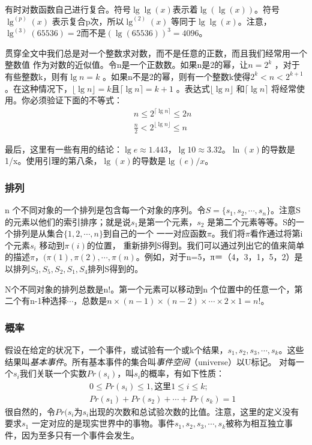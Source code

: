 有时对数函数自己进行复合。符号$\lg\lg(x)$表示着$\lg(\lg(x))$。符号$\lg^{(p)}(x)$
表示复合p次，所以$\lg^{(2)}(x)$
等同于$\lg\lg(x)$。注意，$\lg^{(3)}(65536)=2$而不是$(\lg(65536))^3=4096$。

贯穿全文中我们总是对一个整数求对数，而不是任意的正数，而且我们经常用一个整数值
作为对数的近似值。令n是一个正数数。如果n是2的幂，让$n=2^k$
，对于有些整数k，则有$\lg n=k$
。如果n不是2的幂，则有一个整数k使得$2^k<n<2^{k+1}$
。在这种情况下，$\lfloor \lg n \rfloor =k$且$\lceil \lg n \rceil
=k+1$ 。表达式$\lfloor \lg n \rfloor$ 和$\lceil \lg n \rceil$
将经常使用。你必须验证下面的不等式：
\begin{eqnarray*}
    && n \leq 2^{\lceil \lg n\rceil} \leq 2n \\
    && \frac{n}{2} < 2^{\lfloor \lg n\rfloor} \leq n
\end{eqnarray*}

最后，这里有一些有用的结论：$\lg e\approx 1.443$，$\lg 10 \approx
3.32$。$\ln(x)$的导数是1/x。使用引理的第八条，$\lg(x)$的导数是$\lg(e)/x$。

\subsubsection{排列}
n 个不同对象的一个排列是包含每一个对象的序列。令$S=\{s_1, s_2,
\cdots,
s_n\}$。注意S的元素以他们的索引排序；就是说$s_1$是第一个元素，$s_2$
是第二个元素等等。S的一个排列是从集合$\{1,2,\cdots,n\}$到自己的一个
一一对应函数$\pi$。我们将$\pi$看作通过将第i个元素$s_i$
移动到$\pi(i)$的位置，
重新排列S得到。我们可以通过列出它的值来简单的描述$\pi$，$(\pi(1),
\pi(2), \cdots,
\pi(n)$。例如，对于n=5，π＝（4，3，1，5，2）是以排列$S_3, S_5, S_2,
S_1, S_4$排列S得到的。

N个不同对象的排列总数是n!。第一个元素可以移动到n
个位置中的任意一个，第二个有n-1种选择$\cdots$，总数是$n \times
(n-1)\times(n-2)\times\cdots \times 2 \times1= n!$。

\subsubsection{概率}
假设在给定的状况下，一个事件，或试验有一个或k个结果，$s_1, s_2, s_3,
\cdots,
s_k$。这些结果叫\emph{基本事件}。所有基本事件的集合叫\emph{事件空间}（universe）以U标记。
对每一个$s_i$我们关联一个实数$Pr(s_i)$，叫$s_i$的概率，有如下性质：
\begin{eqnarray*}
    &&0\leq Pr(s_i) \leq 1, \mbox{这里} 1\leq i \leq k;\\
    &&Pr(s_1)+Pr(s_2)+\cdots+ Pr(s_k)=1
\end{eqnarray*}
很自然的，令$Pr(s_i$为$s_i$出现的次数和总试验次数的比值。注意，这里的定义没有要求$s_1$
一定对应的是现实世界中的事物。事件$s_1, s_2, s_3, \cdots,
s_k$被称为相互独立事件，因为至多只有一个事件会发生。

